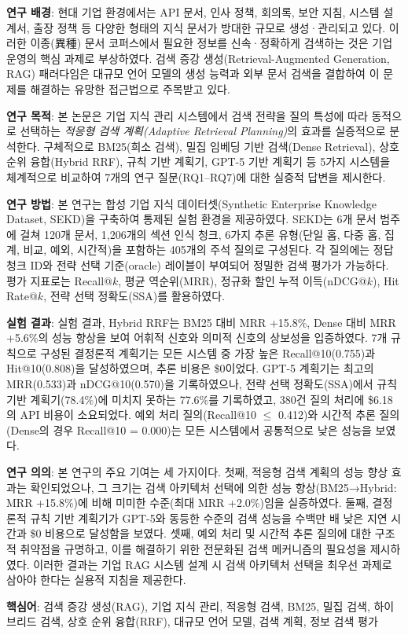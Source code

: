 \begin{abstractko}

\textbf{연구 배경}: 현대 기업 환경에서는 API 문서, 인사 정책, 회의록, 보안 지침, 시스템 설계서, 출장 정책 등 다양한 형태의 지식 문서가 방대한 규모로 생성·관리되고 있다. 이러한 이종(異種) 문서 코퍼스에서 필요한 정보를 신속·정확하게 검색하는 것은 기업 운영의 핵심 과제로 부상하였다. 검색 증강 생성(Retrieval-Augmented Generation, RAG) 패러다임은 대규모 언어 모델의 생성 능력과 외부 문서 검색을 결합하여 이 문제를 해결하는 유망한 접근법으로 주목받고 있다.

\textbf{연구 목적}: 본 논문은 기업 지식 관리 시스템에서 검색 전략을 질의 특성에 따라 동적으로 선택하는 \emph{적응형 검색 계획(Adaptive Retrieval Planning)}의 효과를 실증적으로 분석한다. 구체적으로 BM25(희소 검색), 밀집 임베딩 기반 검색(Dense Retrieval), 상호 순위 융합(Hybrid RRF), 규칙 기반 계획기, GPT-5 기반 계획기 등 5가지 시스템을 체계적으로 비교하여 7개의 연구 질문(RQ1--RQ7)에 대한 실증적 답변을 제시한다.

\textbf{연구 방법}: 본 연구는 합성 기업 지식 데이터셋(Synthetic Enterprise Knowledge Dataset, SEKD)을 구축하여 통제된 실험 환경을 제공하였다. SEKD는 6개 문서 범주에 걸쳐 120개 문서, 1,206개의 섹션 인식 청크, 6가지 추론 유형(단일 홉, 다중 홉, 집계, 비교, 예외, 시간적)을 포함하는 405개의 주석 질의로 구성된다. 각 질의에는 정답 청크 ID와 전략 선택 기준(oracle) 레이블이 부여되어 정밀한 검색 평가가 가능하다. 평가 지표로는 Recall@$k$, 평균 역순위(MRR), 정규화 할인 누적 이득(nDCG@$k$), Hit Rate@$k$, 전략 선택 정확도(SSA)를 활용하였다.

\textbf{실험 결과}: 실험 결과, Hybrid RRF는 BM25 대비 MRR +15.8\%, Dense 대비 MRR +5.6\%의 성능 향상을 보여 어휘적 신호와 의미적 신호의 상보성을 입증하였다. 7개 규칙으로 구성된 결정론적 계획기는 모든 시스템 중 가장 높은 Recall@10(0.755)과 Hit@10(0.808)을 달성하였으며, 추론 비용은 \$0이었다. GPT-5 계획기는 최고의 MRR(0.533)과 nDCG@10(0.570)을 기록하였으나, 전략 선택 정확도(SSA)에서 규칙 기반 계획기(78.4\%)에 미치지 못하는 77.6\%를 기록하였고, 380건 질의 처리에 \$6.18의 API 비용이 소요되었다. 예외 처리 질의(Recall@10 $\leq$ 0.412)와 시간적 추론 질의(Dense의 경우 Recall@10 = 0.000)는 모든 시스템에서 공통적으로 낮은 성능을 보였다.

\textbf{연구 의의}: 본 연구의 주요 기여는 세 가지이다. 첫째, 적응형 검색 계획의 성능 향상 효과는 확인되었으나, 그 크기는 검색 아키텍처 선택에 의한 성능 향상(BM25→Hybrid: MRR +15.8\%)에 비해 미미한 수준(최대 MRR +2.0\%)임을 실증하였다. 둘째, 결정론적 규칙 기반 계획기가 GPT-5와 동등한 수준의 검색 성능을 수백만 배 낮은 지연 시간과 \$0 비용으로 달성함을 보였다. 셋째, 예외 처리 및 시간적 추론 질의에 대한 구조적 취약점을 규명하고, 이를 해결하기 위한 전문화된 검색 메커니즘의 필요성을 제시하였다. 이러한 결과는 기업 RAG 시스템 설계 시 검색 아키텍처 선택을 최우선 과제로 삼아야 한다는 실용적 지침을 제공한다.

\bigskip
\noindent\textbf{핵심어}: 검색 증강 생성(RAG), 기업 지식 관리, 적응형 검색, BM25, 밀집 검색, 하이브리드 검색, 상호 순위 융합(RRF), 대규모 언어 모델, 검색 계획, 정보 검색 평가

\end{abstractko}

